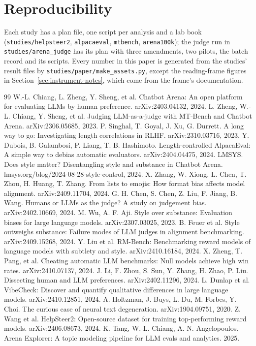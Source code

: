 \documentclass[11pt]{article}
\begin{document}
\section{Reproducibility}
Each study has a plan file, one script per analysis and a lab book (\texttt{studies/helpsteer2}, \texttt{alpacaeval}, \texttt{mtbench}, \texttt{arena100k}); the judge run in \texttt{studies/arena\_judge} has its plan with three amendments, two pilots, the batch record and its scripts. Every number in this paper is generated from the studies' result files by \texttt{studies/paper/make\_assets.py}, except the reading-frame figures in Section~\ref{sec:instrument-notes}, which come from the frame's documentation.

\begin{thebibliography}{99}\small
{} W.-L. Chiang, L. Zheng, Y. Sheng, et al. Chatbot Arena: An open platform for evaluating LLMs by human preference. arXiv:2403.04132, 2024.
 L. Zheng, W.-L. Chiang, Y. Sheng, et al. Judging LLM-as-a-judge with MT-Bench and Chatbot Arena. arXiv:2306.05685, 2023.
 P. Singhal, T. Goyal, J. Xu, G. Durrett. A long way to go: Investigating length correlations in RLHF. arXiv:2310.03716, 2023.
 Y. Dubois, B. Galambosi, P. Liang, T. B. Hashimoto. Length-controlled AlpacaEval: A simple way to debias automatic evaluators. arXiv:2404.04475, 2024.
 LMSYS. Does style matter? Disentangling style and substance in Chatbot Arena. lmsys.org/blog/2024-08-28-style-control, 2024.
 X. Zhang, W. Xiong, L. Chen, T. Zhou, H. Huang, T. Zhang. From lists to emojis: How format bias affects model alignment. arXiv:2409.11704, 2024.
 G. H. Chen, S. Chen, Z. Liu, F. Jiang, B. Wang. Humans or LLMs as the judge? A study on judgement bias. arXiv:2402.10669, 2024.
 M. Wu, A. F. Aji. Style over substance: Evaluation biases for large language models. arXiv:2307.03025, 2023.
 B. Feuer et al. Style outweighs substance: Failure modes of LLM judges in alignment benchmarking. arXiv:2409.15268, 2024.
 Y. Liu et al. RM-Bench: Benchmarking reward models of language models with subtlety and style. arXiv:2410.16184, 2024.
 X. Zheng, T. Pang, et al. Cheating automatic LLM benchmarks: Null models achieve high win rates. arXiv:2410.07137, 2024.
 J. Li, F. Zhou, S. Sun, Y. Zhang, H. Zhao, P. Liu. Dissecting human and LLM preferences. arXiv:2402.11296, 2024.
 L. Dunlap et al. VibeCheck: Discover and quantify qualitative differences in large language models. arXiv:2410.12851, 2024.
 A. Holtzman, J. Buys, L. Du, M. Forbes, Y. Choi. The curious case of neural text degeneration. arXiv:1904.09751, 2020.
 Z. Wang et al. HelpSteer2: Open-source dataset for training top-performing reward models. arXiv:2406.08673, 2024.
 K. Tang, W.-L. Chiang, A. N. Angelopoulos. Arena Explorer: A topic modeling pipeline for LLM evals and analytics. 2025.
\end{thebibliography}
\end{document}
